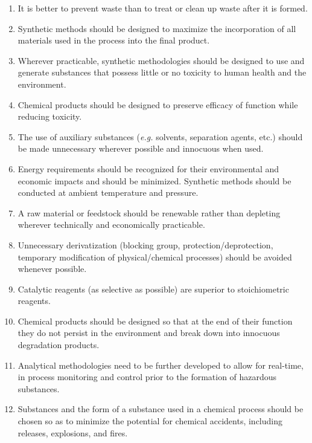 \begin{enumerate}
  \item \label{itm:waste}It is better to prevent waste than to treat or clean up waste after it is formed.
  
  \item \label{itm:incorporation}Synthetic methods should be designed to maximize the incorporation of
  all materials used in the process into the final product.
  
  \item \label{itm:toxicity}Wherever practicable, synthetic methodologies should be designed to use
  and generate substances that possess little or no toxicity to human health and
  the environment.
  
  \item \label{itm:efficacy}Chemical products should be designed to preserve efficacy of function
  while reducing toxicity.
  
  \item \label{itm:aux}The use of auxiliary substances (\textit{e.g.} solvents, separation agents, etc.)
  should be made unnecessary wherever possible and innocuous when used.
  
  \item \label{itm:energy}Energy requirements should be recognized for their environmental and
  economic impacts and should be minimized. Synthetic methods should be
  conducted at ambient temperature and pressure.
  
  \item \label{itm:renewable}A raw material or feedstock should be renewable
  rather than depleting wherever technically and economically practicable.
  
  \item \label{itm:derivatization}Unnecessary derivatization (blocking group, protection/deprotection,
  temporary modification of physical/chemical processes) should be avoided
  whenever possible.
  
  \item \label{itm:catalysts}Catalytic reagents (as selective as possible) are superior to
  stoichiometric reagents.
  
  \item \label{itm:persistence}Chemical products should be designed so that at the end of their
  function they do not persist in the environment and break down into innocuous
  degradation products.
  
  \item \label{itm:monitoring}Analytical methodologies need to be further developed to allow for
  real-time, in process monitoring and control prior to the formation of
  hazardous substances.
  
  \item \label{itm:safe}Substances and the form of a substance used in a chemical process should
  be chosen so as to minimize the potential for chemical accidents, including
  releases, explosions, and fires.

\end{enumerate}

